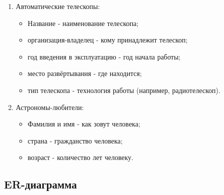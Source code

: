 \documentclass[14pt]{extreport}
\begin{document}
{\begin{enumerate}
        \begin{itemize}
            \item Название - формальное наименование организации;
        
            \item страна - государство, в которой зарегистрирована организация;

            \item бюджет - годовой капитал;
            
            \item тип финансирования - откуда организация пополняет бюджет.
        \end{itemize}

        \item Автоматические телескопы:

        \begin{itemize}
            \item Название - наименование телескопа;
        
            \item организация-владелец - кому принадлежит телескоп;
            
            \item год введения в эксплуатацию - год начала работы;
            
            \item место развёртывания - где находится;  
            
            \item тип телескопа - технология работы (например, радиотелескоп).
        \end{itemize}

        \item Астрономы-любители:

        \begin{itemize}
            \item Фамилия и имя - как зовут человека;
        
            \item страна - гражданство человека;
            
            \item возраст - количество лет человеку.
        \end{itemize}

    \end{enumerate}

        \subsection{ER-диаграмма}

}
\end{document}

